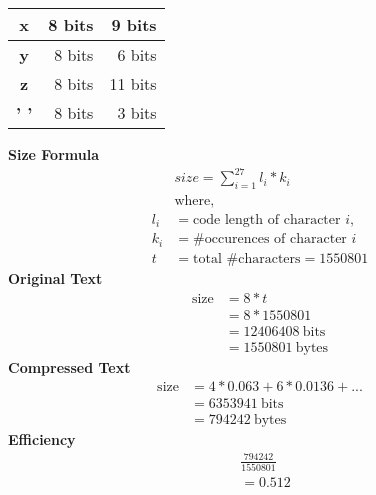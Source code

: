 \documentclass{article}
\begin{document}
\begin{minipage}[t]{.5\textwidth}
\begin{tabular}{|c|r|r|}
            \textbf{x}                              & 8 bits                                        & 9 bits                                               \\ \hline
            \textbf{y}                              & 8 bits                                        & 6 bits                                               \\ \hline
            \textbf{z}                              & 8 bits                                        & 11 bits                                              \\ \hline
            \textbf{' '}                            & 8 bits                                        & 3 bits                                               \\ \hline
        \end{tabular}
        \vfill \null
    \end{minipage}%
    \begin{minipage}[t]{.5\textwidth}
        \null \vfill
        \textbf{Size Formula}
        \begin{align*}
            &size = \sum_{i = 1}^{27} l_i * k_i \\
            &\text{where,}\\
            l_i &= \text{code length of character } i, \\
            k_i &= \text{\# occurences of character } i \\
              t &= \text{total \# characters} = 1550801
        \end{align*}
        \textbf{Original Text}
        \begin{align*}
            \text{size} &= 8 * t \\
                        &= 8 * 1550801 \\
                        &= 12406408 \ \text{bits} \\
                        &= 1550801 \ \text{bytes}
        \end{align*}
        \textbf{Compressed Text}
        \begin{align*}
            \text{size} &= 4 * 0.063 + 6 * 0.0136 + ...\\
                        &= 6353941 \ \text{bits} \\
                        &= 794242 \ \text{bytes}
        \end{align*}
        \textbf{Efficiency}
            \begin{align*}
                &\frac{794242}{1550801} \\
                &=0.512
            \end{align*}
        \vfill \null
    \end{minipage}%
    
\end{document}
